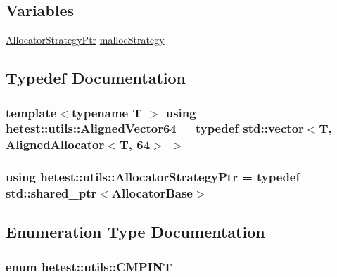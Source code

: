 \subsection*{Variables}
\begin{DoxyCompactItemize}
\item 
\hyperlink{namespacehetest_1_1utils_a3f7f347b9f62a88014bdcc45f7987846}{Allocator\-Strategy\-Ptr} \hyperlink{namespacehetest_1_1utils_ac87aad4fed0f78704edd9639dcc44e03}{malloc\-Strategy}
\end{DoxyCompactItemize}


\subsection{Typedef Documentation}
\hypertarget{namespacehetest_1_1utils_ad5b6a78d49dc8f6790f7fd2b10bf3db0}{
\subsubsection[{Aligned\-Vector64}]{\setlength{\rightskip}{0pt plus 5cm}template$<$typename T $>$ using {\bf hetest\-::utils\-::\-Aligned\-Vector64} = typedef std\-::vector$<$T, {\bf Aligned\-Allocator}$<$T, 64$>$ $>$}}\label{namespacehetest_1_1utils_ad5b6a78d49dc8f6790f7fd2b10bf3db0}
\hypertarget{namespacehetest_1_1utils_a3f7f347b9f62a88014bdcc45f7987846}{
\subsubsection[{Allocator\-Strategy\-Ptr}]{\setlength{\rightskip}{0pt plus 5cm}using {\bf hetest\-::utils\-::\-Allocator\-Strategy\-Ptr} = typedef std\-::shared\-\_\-ptr$<${\bf Allocator\-Base}$>$}}\label{namespacehetest_1_1utils_a3f7f347b9f62a88014bdcc45f7987846}


\subsection{Enumeration Type Documentation}
\hypertarget{namespacehetest_1_1utils_ac7fa0c35a418955522dc45b10864fdc8}{
\subsubsection[{C\-M\-P\-I\-N\-T}]{\setlength{\rightskip}{0pt plus 5cm}enum {\bf hetest\-::utils\-::\-C\-M\-P\-I\-N\-T}\hspace{0.3cm}{\ttfamily [strong]}}}\label{namespacehetest_1_1utils_ac7fa0c35a418955522dc45b10864fdc8}



